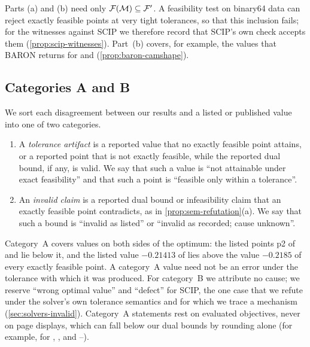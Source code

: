 Parts (a) and (b) need only $\mathcal{F}(\mathcal{M})\subseteq\mathcal{F}'$.
A feasibility test on binary64 data can reject exactly feasible points at very tight tolerances, so that this inclusion fails; for the witnesses against SCIP we therefore record that SCIP's own check accepts them (\cref{prop:scip-witnesses}).
Part~(b) covers, for example, the values that BARON returns for  and  (\cref{prop:baron-camshape}).

\subsection{Categories A and B}\label{sec:semantics-categories}

We sort each disagreement between our results and a listed or published value into one of two categories.

\begin{definition}\label{def:sem-categories}
\leavevmode
\begin{enumerate}\setlength{\itemsep}{0pt}\setlength{\parsep}{0pt}
\item[(A)] A \emph{tolerance artifact} is a reported value that no exactly feasible point attains, or a reported point that is not exactly feasible, while the reported dual bound, if any, is valid.
We say that such a value is ``not attainable under exact feasibility'' and that such a point is ``feasible only within a tolerance''.
\item[(B)] An \emph{invalid claim} is a reported dual bound or infeasibility claim that an exactly feasible point contradicts, as in \cref{prop:sem-refutation}(a).
We say that such a bound is ``invalid as listed'' or ``invalid as recorded; cause unknown''.
\end{enumerate}
\end{definition}

Category~A covers values on both sides of the optimum: the listed points p2 of  and  lie below it, and the listed value $-0.21413$ of  lies above the value $-0.2185$ of every exactly feasible point.
A category~A value need not be an error under the tolerance with which it was produced.
For category~B we attribute no cause; we reserve ``wrong optimal value'' and ``defect'' for SCIP, the one case that we refute under the solver's own tolerance semantics and for which we trace a mechanism (\cref{sec:solvers-invalid}).
Category~A statements rest on evaluated objectives, never on page displays, which can fall below our dual bounds by rounding alone (for example, for , ,  and --).

